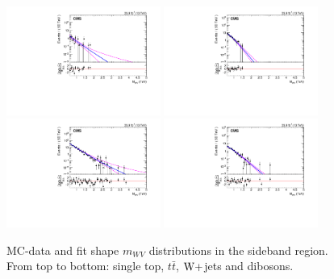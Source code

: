 \begin{figure}[!htbp] 
	 \centering 
	 \includegraphics[width=0.45\textwidth]{Plots/BackgroundEstimation/WV/m_lvj_fitting/WWTree_STop_m_lvj_sb_loExpN_with_pull_log.pdf}
	 \includegraphics[width=0.45\textwidth]{Plots/BackgroundEstimation/WV/m_lvj_fitting/WWTree_TTbar_m_lvj_sb_loExpN_with_pull_log.pdf}
	 \includegraphics[width=0.45\textwidth]{Plots/BackgroundEstimation/WV/m_lvj_fitting/WWTree_VJets_m_lvj_sb_loExpTail_with_pull_log.pdf}
	 \includegraphics[width=0.45\textwidth]{Plots/BackgroundEstimation/WV/m_lvj_fitting/WWTree_VV_EWK_QCD_m_lvj_sb_loExpN_with_pull_log.pdf}
	 \caption{MC-data and fit shape $m_{WV}$ distributions in the sideband region. From top to bottom: single top, $t\bar{t}$, $\mathrm{W}+$jets and dibosons.}
	 \label{fig:mWW_1}
\end{figure}





